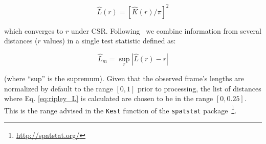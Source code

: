 \documentclass[draft]{aa}
\begin{document}



 \begin{equation}
 \hat{L}(r) = [\hat{K}(r)/\pi]^2
 \end{equation}

 \noindent which converges to $r$ under CSR. Following~\cite{Dixon_2014} we
 combine information from several distances ($r$ values) in a single test
 statistic defined as:

 \begin{equation}
 \hat{L}_{m} = \sup_{r} |\hat{L}(r) - r|
 \label{eq:ripley_L}
 \end{equation}

 \noindent (where ``sup'' is the supremum).
 Given that the observed frame's lengths are normalized by default to the
 range $[0,1]$ prior to processing, the list of distances where Eq.
 \ref{eq:ripley_L} is calculated are chosen to be in the range $[0, 0.25]$.
 This is the range advised in the \texttt{Kest} function of the
 \texttt{spatstat}
 package~\citep{Baddeley_2015}\footnote{\url{http://spatstat.org/}}.
\end{document}
